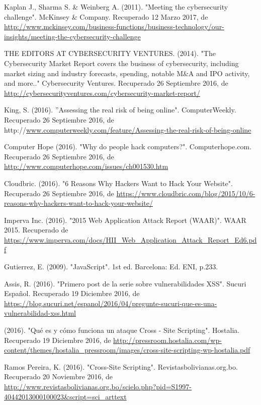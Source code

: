 
\begin{thebibliography}{99}


 Kaplan J., Sharma S. \& Weinberg A. (2011). "Meeting the cybersecurity challenge". McKinsey \& Company. Recuperado 12 Marzo 2017, de \url{http://www.mckinsey.com/business-functions/business-technology/our-insights/meeting-the-cybersecurity-challenge}

 THE EDITORS AT CYBERSECURITY VENTURES. (2014). "The Cybersecurity Market Report covers the business of cybersecurity, including market sizing and industry forecasts, spending, notable M\&A and IPO activity, and more.." Cybersecurity Ventures. Recuperado 26 Septiembre 2016, de \url{http://cybersecurityventures.com/cybersecurity-market-report/}

 King, S. (2016). ''Assessing the real risk of being online". ComputerWeekly. Recuperado 26 Septiembre 2016, de http://\url{www.computerweekly.com/feature/Assessing-the-real-risk-of-being-online}

 Computer Hope (2016). "Why do people hack computers?". Computerhope.com. Recuperado 26 Septiembre 2016, de \url{http://www.computerhope.com/issues/ch001530.htm}

 Cloudbric. (2016). "6 Reasons Why Hackers Want to Hack Your Website". Recuperado 26 Septiembre 2016, de \url{https://www.cloudbric.com/blog/2015/10/6-reasons-why-hackers-want-to-hack-your-website/}

 Imperva Inc. (2016). "2015 Web Application Attack Report (WAAR)". WAAR 2015. Recuperado de \url{https://www.imperva.com/docs/HII\_Web\_Application\_Attack\_Report\_Ed6.pdf}

 Gutierrez, E. (2009). "JavaScript". 1st ed. Barcelona: Ed. ENI, p.233.

 Assis, R. (2016). "Primero post de la serie sobre vulnerabilidades XSS". Sucuri Español. Recuperado 19 Diciembre 2016, de \url{https://blog.sucuri.net/espanol/2016/04/pregunte-sucuri-que-es-una-vulnerabilidad-xss.html}

 (2016). "Qué es y cómo funciona un ataque Cross - Site Scripting". Hostalia. Recuperado 19 Diciembre 2016, de \url{http://pressroom.hostalia.com/wp-content/themes/hostalia\_pressroom/images/cross-site-scripting-wp-hostalia.pdf}

 Ramos Pereira, K. (2016). "Cross-Site Scripting". Revistasbolivianas.org.bo. Recuperado 20 Noviembre 2016, de \url{http://www.revistasbolivianas.org.bo/scielo.php?pid=S1997-40442013000100023\&script=sci\_arttext}


\end{thebibliography}
